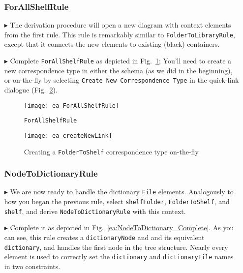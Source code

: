 \begin{itemize}
\newpage

\subsubsection{ForAllShelfRule} %

\item[$\blacktriangleright$] The derivation procedure will open a new diagram with context elements from the first rule. This rule is remarkably similar to
\texttt{FolderToLibraryRule}, except that it connects the new elements to existing (black) containers.

\item[$\blacktriangleright$] Complete \texttt{ForAllShelfRule} as depicted in Fig.~\ref{ea:ForAllShelves_Complete}; You'll need to create a new correspondence
type in either the schema (as we did in the beginning), or on-the-fly by selecting \texttt{Create New Correspondence Type} in the quick-link dialogue
(Fig.~\ref{ea:corrOnTheFly}).

\begin{figure}[htbp]
\begin{center}
  \texttt{[image: ea\_ForAllShelfRule]}
  \caption{\texttt{ForAllShelfRule}}
  \label{ea:ForAllShelves_Complete}
\end{center}
\end{figure}

\begin{figure}[htbp]
\begin{center}
  \texttt{[image: ea\_createNewLink]}
  \caption{Creating a \texttt{FolderToShelf} correspondence type on-the-fly}
  \label{ea:corrOnTheFly}
\end{center}
\end{figure}

\subsubsection{NodeToDictionaryRule} %

\item[$\blacktriangleright$] We are now ready to handle the dictionary \texttt{File} elements. Analogously to how you began the previous rule, select
\texttt{shelfFolder}, \texttt{FolderToShelf}, and \texttt{shelf}, and derive \texttt{NodeToDictionaryRule} with this context.

\item[$\blacktriangleright$] Complete it as depicted in Fig.~\ref{ea:NodeToDictionary_Complete}. As you can see, this rule creates a 
\texttt{dictionaryNode} and and its equivalent \texttt{dictionary}, and handles the first node in the tree structure. Nearly every
element is used to correctly set the \texttt{dictionary} and \texttt{dictionaryFile} names in two constraints.


\end{itemize}
